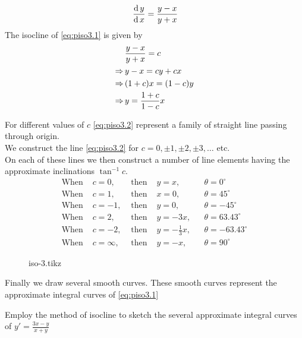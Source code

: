 \documentclass[../main-sheet.tex]{subfiles}
\begin{document}
\begin{soln}
    \begin{equation}
        \,\frac{\mathrm{d}\,y}{\mathrm{d}\,x}=\frac{y-x}{y+x}\label{eq:piso3.1}
    \end{equation}
    The isocline of \eqref{eq:piso3.1} is given by 
    \begin{align}
        &\frac{y-x}{y+x}=c\notag\\
        \Rightarrow\,&y-x=cy+cx\notag\\
        \Rightarrow\,&(1+c)x=(1-c)y\notag\\
        \Rightarrow\,&y=\frac{1+c}{1-c}x\label{eq:piso3.2}
    \end{align}
    
    For different values of \(c\) \eqref{eq:piso3.2} represent a family of straight line passing through origin.\\
    We construct the line \eqref{eq:piso3.2} for \(c=0,\pm1,\pm2,\pm3,\dots\) etc.\\
    On each of these lines we then construct a number of line elements having the approximate inclinations \(\tan^{-1}c\).\\
    \begin{align*}
        \text{When } & c=0,  & \text{ then } & y=x,   &&\theta=0^{\circ}\\
        \text{When } & c=1,  & \text{ then } & x=0, &&\theta=45^{\circ}\\
        \text{When } & c=-1, & \text{ then } & y=0, &&\theta=-45^{\circ}\\
        \text{When } & c=2,  & \text{ then } & y=-3x, &&\theta=63.43^{\circ}\\
        \text{When } & c=-2, & \text{ then } & y=-\frac{1}{3}x, &&\theta=-63.43^{\circ}\\
        \text{When } & c=\infty, & \text{ then } & y=-x, &&\theta=90^{\circ}
    \end{align*}
    \begin{figure}[H]
        \centering
        {iso-3.tikz}
    \end{figure}
    Finally we draw several smooth curves. These smooth curves represent the approximate integral curves of \eqref{eq:piso3.1}
\end{soln}
\begin{prob}
    Employ the method of isocline to sketch the several approximate integral curves of \(y'=\frac{3x-y}{x+y}\)
\end{prob}
\end{document}
